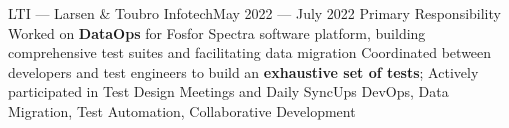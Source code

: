 \resumeSubHeadingListStart
{}
{LTI --- Larsen \& Toubro Infotech}{May 2022 --- July 2022}
\resumeItemListStart
      \resumeItem
        {Primary Responsibility}
        {Worked on \textbf{DataOps} for Fosfor Spectra software platform, building comprehensive test suites and facilitating data migration}
      {Coordinated between developers and test engineers to build an \textbf{exhaustive set of tests}; Actively participated in Test Design Meetings and Daily SyncUps}
      {DevOps, Data Migration, Test Automation, Collaborative Development}
\resumeItemListEnd
\resumeSubHeadingListEnd